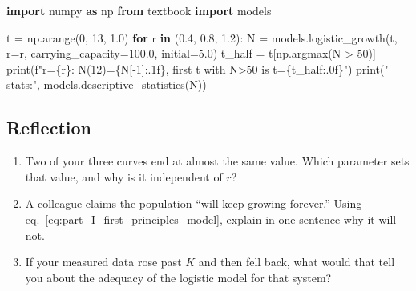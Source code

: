 \documentclass[
]{article}
\newenvironment{Shaded}{}{}
\newcommand{\BuiltInTok}[1]{\textcolor[rgb]{0.00,0.50,0.00}{#1}}
\newcommand{\ControlFlowTok}[1]{\textcolor[rgb]{0.00,0.44,0.13}{\textbf{#1}}}
\newcommand{\DecValTok}[1]{\textcolor[rgb]{0.25,0.63,0.44}{#1}}
\newcommand{\FloatTok}[1]{\textcolor[rgb]{0.25,0.63,0.44}{#1}}
\newcommand{\ImportTok}[1]{\textcolor[rgb]{0.00,0.50,0.00}{\textbf{#1}}}
\newcommand{\KeywordTok}[1]{\textcolor[rgb]{0.00,0.44,0.13}{\textbf{#1}}}
\newcommand{\NormalTok}[1]{#1}
\newcommand{\OperatorTok}[1]{\textcolor[rgb]{0.40,0.40,0.40}{#1}}
\newcommand{\SpecialCharTok}[1]{\textcolor[rgb]{0.25,0.44,0.63}{#1}}
\newcommand{\SpecialStringTok}[1]{\textcolor[rgb]{0.73,0.40,0.53}{#1}}
\newcommand{\StringTok}[1]{\textcolor[rgb]{0.25,0.44,0.63}{#1}}
\providecommand{\tightlist}{%
  \setlength{\itemsep}{0pt}\setlength{\parskip}{0pt}}
\theoremstyle{plain}
\theoremstyle{definition}
\begin{document}
\begin{Shaded}
\begin{Highlighting}[]
\ImportTok{import}\NormalTok{ numpy }\ImportTok{as}\NormalTok{ np}
\ImportTok{from}\NormalTok{ textbook }\ImportTok{import}\NormalTok{ models}

\NormalTok{t }\OperatorTok{=}\NormalTok{ np.arange(}\DecValTok{0}\NormalTok{, }\DecValTok{13}\NormalTok{, }\FloatTok{1.0}\NormalTok{)}
\ControlFlowTok{for}\NormalTok{ r }\KeywordTok{in}\NormalTok{ (}\FloatTok{0.4}\NormalTok{, }\FloatTok{0.8}\NormalTok{, }\FloatTok{1.2}\NormalTok{):}
\NormalTok{    N }\OperatorTok{=}\NormalTok{ models.logistic\_growth(t, r}\OperatorTok{=}\NormalTok{r, carrying\_capacity}\OperatorTok{=}\FloatTok{100.0}\NormalTok{, initial}\OperatorTok{=}\FloatTok{5.0}\NormalTok{)}
\NormalTok{    t\_half }\OperatorTok{=}\NormalTok{ t[np.argmax(N }\OperatorTok{\textgreater{}} \DecValTok{50}\NormalTok{)]}
    \BuiltInTok{print}\NormalTok{(}\SpecialStringTok{f"r=}\SpecialCharTok{\{}\NormalTok{r}\SpecialCharTok{\}}\SpecialStringTok{: N(12)=}\SpecialCharTok{\{}\NormalTok{N[}\OperatorTok{{-}}\DecValTok{1}\NormalTok{]}\SpecialCharTok{:.1f\}}\SpecialStringTok{, first t with N\textgreater{}50 is t=}\SpecialCharTok{\{}\NormalTok{t\_half}\SpecialCharTok{:.0f\}}\SpecialStringTok{"}\NormalTok{)}
    \BuiltInTok{print}\NormalTok{(}\StringTok{"  stats:"}\NormalTok{, models.descriptive\_statistics(N))}
\end{Highlighting}
\end{Shaded}

\subsection{Reflection}\label{reflection-3}

\begin{enumerate}
\def\labelenumi{\arabic{enumi}.}
\tightlist
\item
  Two of your three curves end at almost the same value. Which parameter
  sets that value, and why is it independent of \(r\)?
\item
  A colleague claims the population ``will keep growing forever.'' Using
  eq.~\ref{eq:part_I_first_principles_model}, explain in one sentence
  why it will not.
\item
  If your measured data rose past \(K\) and then fell back, what would
  that tell you about the adequacy of the logistic model for that
  system?
\end{enumerate}

\newpage
\end{document}
